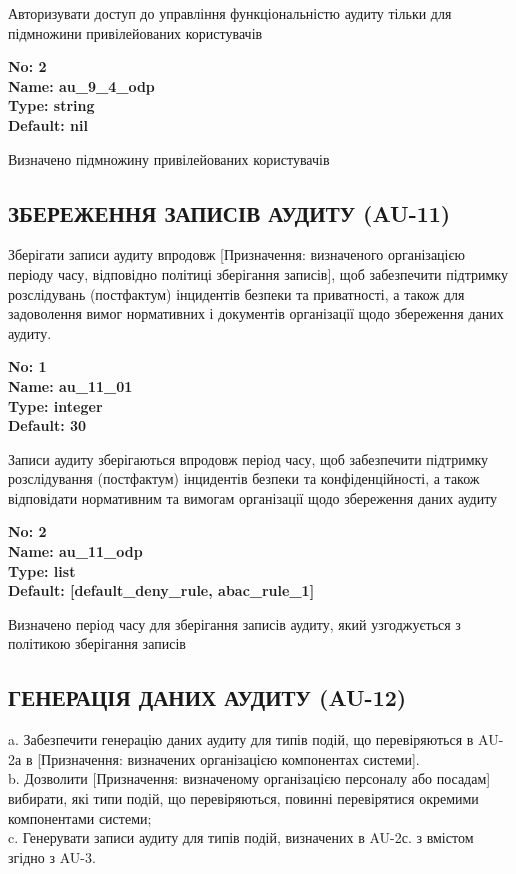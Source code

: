 \documentclass{article}
\begin{document}
{\footnotesize Авторизувати доступ до управління функціональністю аудиту тільки для підмножини привілейованих користувачів}


{\footnotesize\bfseries
No: 2\\
Name: au\_\allowbreak{}9\_\allowbreak{}4\_\allowbreak{}odp\\
Type: string\\
Default: nil
}

{\footnotesize Визначено підмножину привілейованих користувачів}




\subsection{ЗБЕРЕЖЕННЯ ЗАПИСІВ АУДИТУ (AU-11)}
Зберігати записи аудиту впродовж [Призначення: визначеного організацією періоду часу, відповідно політиці зберігання записів], щоб забезпечити підтримку розслідувань (постфактум) інцидентів безпеки та приватності, а також для задоволення вимог нормативних і документів організації щодо збереження даних аудиту.

\vspace{10pt}
{\footnotesize\bfseries
No: 1\\
Name: au\_\allowbreak{}11\_\allowbreak{}01\\
Type: integer\\
Default: 30
}

{\footnotesize Записи аудиту зберігаються впродовж період часу, щоб забезпечити підтримку розслідування (постфактум) інцидентів безпеки та конфіденційності, а також відповідати нормативним та вимогам організації щодо збереження даних аудиту}


{\footnotesize\bfseries
No: 2\\
Name: au\_\allowbreak{}11\_\allowbreak{}odp\\
Type: list\\
Default: [\textquotedbl{}default\_\allowbreak{}deny\_\allowbreak{}rule\textquotedbl{}, \textquotedbl{}abac\_\allowbreak{}rule\_\allowbreak{}1\textquotedbl{}]
}

{\footnotesize Визначено період часу для зберігання записів аудиту, який узгоджується з політикою зберігання записів}




\subsection{ГЕНЕРАЦІЯ ДАНИХ АУДИТУ (AU-12)}
a. Забезпечити генерацію даних аудиту для типів подій, що перевіряються в AU-2а в [Призначення: визначених організацією компонентах системи].\\ 
b. Дозволити [Призначення: визначеному організацією персоналу або посадам] вибирати, які типи подій, що перевіряються, повинні перевірятися окремими компонентами системи;\\ 
c. Генерувати записи аудиту для типів подій, визначених в AU-2с. з вмістом згідно з AU-3.
\end{document}
